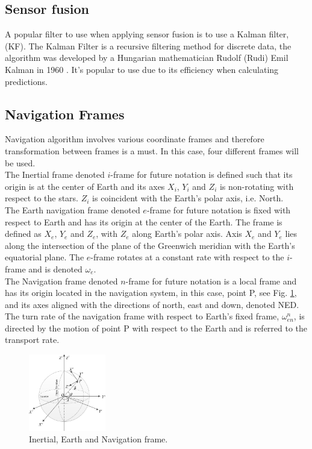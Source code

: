 \subsection{Sensor fusion}
A popular filter to use when applying sensor fusion is to use a Kalman filter, (KF). The Kalman Filter is a recursive filtering method for discrete data, the algorithm was developed by a Hungarian mathematician Rudolf (Rudi) Emil Kalman in 1960 \cite{boken}. It's popular to use due to its efficiency when calculating predictions. \cite{kf eff}

\subsection{Navigation Frames}
Navigation algorithm involves various coordinate frames and therefore transformation between frames is a must. In this case, four different frames will be used.\\

The Inertial frame denoted $i$-frame for future notation is defined such that its origin is at the center of Earth and its axes $X_i$, $Y_i$ and $Z_i$ is non-rotating with respect to the stars. $Z_i$ is coincident with the Earth's polar axis, i.e. North.\\

The Earth navigation frame denoted $e$-frame for future notation is fixed with respect to Earth and has its origin at the center of the Earth. The frame is defined as $X_e$, $Y_e$ and $Z_e$, with $Z_e$ along Earth's polar axis. Axis $X_e$ and $Y_e$ lies along the intersection of the plane of the Greenwich meridian with the Earth's equatorial plane. The $e$-frame rotates at a constant rate with respect to the $i$-frame and is denoted $\omega_e$.\\

The Navigation frame denoted $n$-frame for future notation is a local frame and has its origin located in the navigation system, in this case, point P, see Fig. \ref{WGS}, and its axes aligned with the directions of north, east and down, denoted NED. The turn rate of the navigation frame with respect to Earth's fixed frame, $\omega_{en}^n$, is directed by the motion of point P with respect to the Earth and is referred to the transport rate.   

\begin{figure}[H]
\centering
\includegraphics[width=0.3\textwidth]{Figures/WGS-coordinates.png}
\caption{Inertial, Earth and Navigation frame.}
\label{WGS}
\end{figure}

